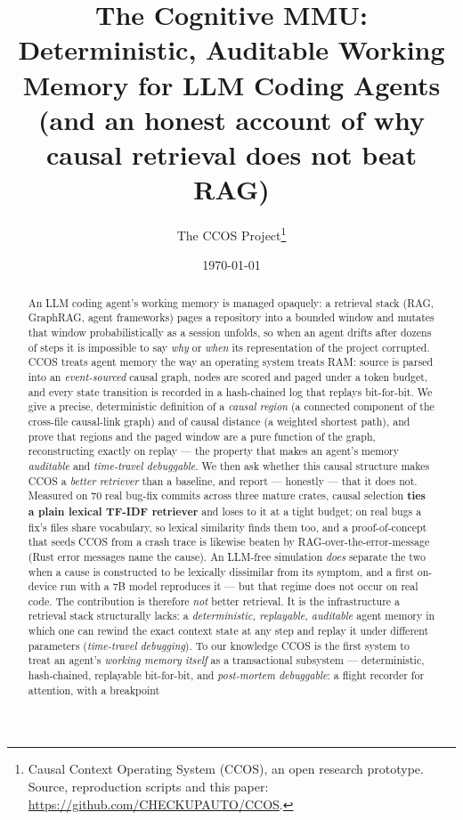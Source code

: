 \documentclass[11pt]{article}
\title{\textbf{The Cognitive MMU:\\ Deterministic, Auditable Working Memory for LLM Coding Agents\\ \large (and an honest account of why causal retrieval does not beat RAG)}}
\author{The CCOS Project\thanks{Causal Context Operating System (CCOS), an open
research prototype. Source, reproduction scripts and this paper:
\url{https://github.com/CHECKUPAUTO/CCOS}.}}
\date{\today}
\begin{document}
\maketitle

\begin{abstract}
An LLM coding agent's working memory is managed opaquely: a retrieval stack (RAG,
GraphRAG, agent frameworks) pages a repository into a bounded window and mutates
that window probabilistically as a session unfolds, so when an agent drifts after
dozens of steps it is impossible to say \emph{why} or \emph{when} its
representation of the project corrupted. CCOS treats agent memory the way an
operating system treats RAM: source is parsed into an \emph{event-sourced} causal
graph, nodes are scored and paged under a token budget, and every state transition
is recorded in a hash-chained log that replays bit-for-bit. We give a precise,
deterministic definition of a \emph{causal region} (a connected component of the
cross-file causal-link graph) and of causal distance (a weighted shortest path),
and prove that regions and the paged window are a pure function of the graph,
reconstructing exactly on replay --- the property that makes an agent's memory
\emph{auditable} and \emph{time-travel debuggable}. We then ask whether this causal structure makes CCOS a \emph{better retriever}
than a baseline, and report --- honestly --- that it does not. Measured on $70$
real bug-fix commits across three mature crates, causal selection \textbf{ties a
plain lexical TF-IDF retriever} and loses to it at a tight budget; on real bugs a
fix's files share vocabulary, so lexical similarity finds them too, and a
proof-of-concept that seeds CCOS from a crash trace is likewise beaten by
RAG-over-the-error-message (Rust error messages name the cause). An LLM-free
simulation \emph{does} separate the two when a cause is constructed to be
lexically dissimilar from its symptom, and a first on-device run with a $7$B model
reproduces it --- but that regime does not occur on real code. The contribution is
therefore \emph{not} better retrieval. It is the infrastructure a retrieval stack
structurally lacks: a \emph{deterministic, replayable, auditable} agent memory in
which one can rewind the exact context state at any step and replay it under
different parameters (\emph{time-travel debugging}). To our knowledge CCOS is the
first system to treat an agent's \emph{working memory itself} as a transactional
subsystem --- deterministic, hash-chained, replayable bit-for-bit, and
\emph{post-mortem debuggable}: a flight recorder for attention, with a breakpoint

\end{abstract}
\end{document}
